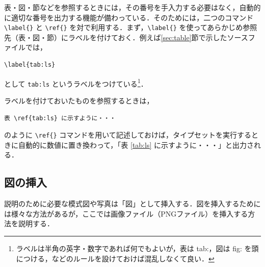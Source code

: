 表・図・節などを参照するときには，その番号を手入力する必要はなく，自動的に適切な番号を出力する機能が備わっている．そのためには，二つのコマンド \verb|\label{}| と \verb|\ref{}| を対で利用する．まず，\verb|\label{}| を使ってあらかじめ参照先（表・図・節）にラベルを付けておく．例えば\ref{sec:table}節で示したソースファイルでは，

\begin{screen}
\begin{verbatim}
\label{tab:ls}
\end{verbatim}
\end{screen}

として \verb|tab:ls| というラベルをつけている\footnote{ラベルは半角の英字・数字であれば何でもよいが，表は tab:，図は fig: を頭につける，などのルールを設けておけば混乱しなくて良い．}．

ラベルを付けておいたものを参照するときは，
\begin{screen}
\begin{verbatim}
表 \ref{tab:ls} に示すように・・・
\end{verbatim}
\end{screen}
のように \verb|\ref{}| コマンドを用いて記述しておけば，タイプセットを実行するときに自動的に数値に置き換わって，「表 \ref{tab:ls} に示すように・・・」と出力される．

\subsection{図の挿入}
\label{sec:figure}

説明のために必要な模式図や写真は「図」として挿入する．図を挿入するためには様々な方法があるが，ここでは画像ファイル（PNGファイル）を挿入する方法を説明する．

